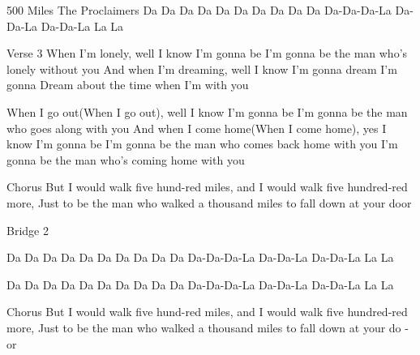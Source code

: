 \begin{song}[]{500 Miles The Proclaimers}
    Da Da Da Da           Da Da Da Da      Da Da Da-Da-Da-La Da-Da-La Da-Da-La La La
    
    
    
    Verse 3
    When I'm lonely, well I know I'm gonna be
    I'm gonna be the man who's lonely without you
    And when I'm dreaming, well I know I'm gonna dream
    I'm gonna Dream about the time when I'm with you
    
    When I go out(When I go out), well I know I'm gonna be
    I'm gonna be the man who goes along with you
    And when I come home(When I come home), yes I know I'm gonna be
    I'm gonna be the man who comes back home with you
    I'm gonna be the man who's coming home with you
    
    
    Chorus
    But I would walk five hund-red miles, and
    I would walk five hundred-red  more,
    Just to be the man who walked a thousand  miles to
    fall down at your door   
    
    Bridge 2
    
    
    Da Da Da Da          Da Da Da Da      Da Da Da-Da-Da-La Da-Da-La Da-Da-La La La
    
    Da Da Da Da           Da Da Da Da      Da Da Da-Da-Da-La Da-Da-La Da-Da-La La La
    
    
    Chorus
    But I would walk five hund-red miles, and
    I would walk five hundred-red  more,
    Just to be the man who walked a thousand  miles to
    fall down  at  your  do  -  or 
    \end{song}
    
    
